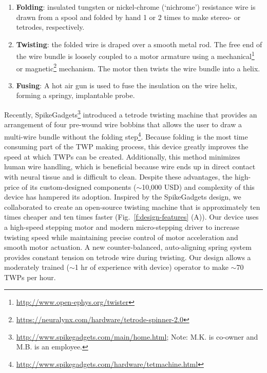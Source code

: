 \documentclass[11pt,a4paper]{article}
\begin{document}
\begin{enumerate}
    \item \textbf{Folding}: insulated tungsten or nickel-chrome (`nichrome')
        resistance wire is drawn from a spool and folded by hand 1 or 2 times
        to make stereo- or tetrodes, respectively.
    \item \textbf{Twisting}: the folded wire is draped over a smooth metal rod.
        The free end of the wire bundle is loosely coupled to a motor armature
        using a mechanical\footnote{\url{http://www.open-ephys.org/twister}} or
        magnetic\footnote{\url{https://neuralynx.com/hardware/tetrode-spinner-2.0}}
        mechanism. The motor then twists the wire bundle into a helix.
    \item \textbf{Fusing}: A hot air gun is used to fuse the insulation
        on the wire helix, forming a springy, implantable probe.
\end{enumerate}

Recently,
SpikeGadgets\footnote{\url{http://www.spikegadgets.com/main/home.html}; Note:
M.K. is co-owner and M.B. is an employee.} introduced a tetrode twisting
machine that provides an arrangement of four pre-wound wire bobbins that allows
the user to draw a multi-wire bundle without the folding
step\footnote{\url{http://www.spikegadgets.com/hardware/tetmachine.html}}.
Because folding is the most time consuming part of the TWP making process,
this device greatly improves the speed at which TWPs can be created.
Additionally, this method minimizes human wire handling, which is beneficial
because wire ends up in direct contact with neural tissue and is difficult to
clean. Despite these advantages, the high-price of its custom-designed
components ($\sim$10,000 USD) and complexity of this device has hampered its
adoption. Inspired by the SpikeGadgets design, we collaborated to create an
open-source twisting machine that is approximately ten times cheaper and ten times faster
(Fig.~\ref{f:design-features} (A)). Our device uses a high-speed stepping motor
and modern micro-stepping driver to increase twisting speed while maintaining
precise control of motor acceleration and smooth motor actuation. A new
counter-balanced, auto-aligning spring system provides constant tension on
tetrode wire during twisting. Our design allows a moderately trained ($\sim$1
hr of experience with device) operator to make $\sim$70 TWPs per hour.
\end{document}
